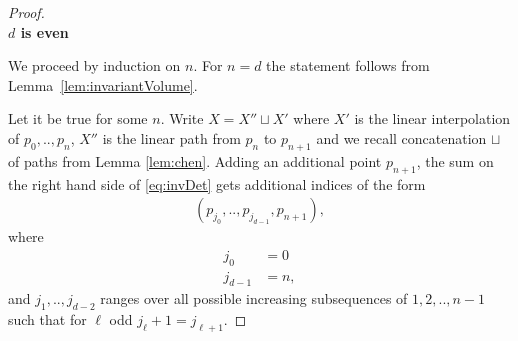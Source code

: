 \documentclass{scrartcl}
\theoremstyle{plain}
\theoremstyle{definition}
\newcommand{\1}[1]{1_{\{#1\}}}
\newcommand{\ds}{d} %
\begin{document}
\begin{proof}
  ~\\

  \textbf{$\ds$ is even }


  We proceed by induction on $n$.
  For $n=\ds$ the statement follows from Lemma~\ref{lem:invariantVolume}.

  Let it be true for some $n$.
  Write $X = X'' \sqcup X'$ where $X'$ is the linear interpolation
  of $p_0, .., p_n$, $X''$ is the linear path from $p_n$ to $p_{n+1}$
  and we recall concatenation $\sqcup$ of paths from Lemma \ref{lem:chen}.
  Adding an additional point $p_{n+1}$,
  the sum on the right hand side of \eqref{eq:invDet}
  gets additional indices of the form
  \begin{align*}
    (p_{j_0}, .., p_{j_{d-1}}, p_{n+1}),
  \end{align*}
  where
  \begin{align*}
    j_0 &= 0 \\
    j_{\ds-1} &= n,
  \end{align*}
  and $j_1,..,j_{\ds-2}$ ranges over all possible increasing
  subsequences of $1,2,..,n-1$ such that
  for $\ell$ odd $j_\ell + 1 = j_{\ell+1}$.
  


\end{proof}
\end{document}
